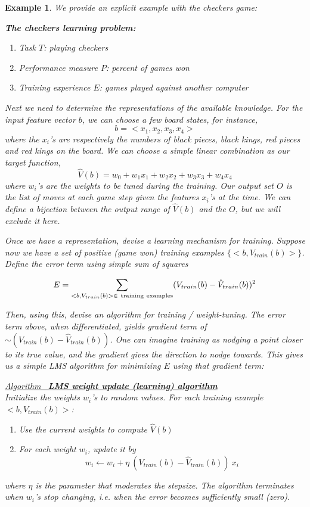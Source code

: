 \documentclass[12pt]{article}  %
\newtheorem{example}{Example}
\newcommand{\algtitle}[1]{\underline{Algorithm \ {\bf #1}} \vspace*{1mm}\\}
\begin{document}
\begin{example}
We provide an explicit example with the checkers game:

{\bf The checkers learning problem:}
\begin{enumerate}
\item Task $T$: playing checkers
\item Performance measure $P$: percent of games won
\item Training experience $E$: games played against another computer
\end{enumerate}

Next we need to determine the representations of the available knowledge. For the input feature vector $b$, we can choose a few board states, for instance, 
$$b = <x_1, x_2, x_3, x_4>$$
where the $x_i$'s are respectively the numbers of black pieces, black kings, red pieces and red kings on the board. We can choose a simple linear combination as our target function,
$$\hat{V}(b) = w_0 + w_1 x_1 + w_2 x_2 + w_3 x_3 + w_4 x_4$$
where $w_i$'s are the weights to be tuned during the training. Our output set $O$ is the list of moves at each game step given the features $x_i$'s at the time. We can define a bijection between the output range of $\hat{V}(b)$ and the $O$, but we will exclude it here.

Once we have a representation, devise a learning mechanism for training. Suppose now we have a set of positive (game won) training examples $\{<b, V_{train}(b)>\}$. Define the error term using simple sum of squares

$$E = \sum_{<b, V_{train}(b)> \in \ {\rm training\ examples}} (V_{train}(b) - \hat{V}_{train}(b))^2$$

Then, using this, devise an algorithm for training / weight-tuning. The error term above, when differentiated, yields gradient term of $\sim(V_{train}(b) - \hat{V}_{train}(b))$. One can imagine training as nodging a point closer to its true value, and the gradient gives the direction to nodge towards. This gives us a simple LMS algorithm for minimizing $E$ using that gradient term:


\algtitle{LMS weight update (learning) algorithm}
Initialize the weights $w_i$'s to random values. For each training example $<b, V_{train}(b)>$:
\begin{enumerate}
	\item Use the current weights to compute $\hat{V}(b)$
	\item For each weight $w_i$, update it by $$w_i \leftarrow w_i + \eta \ (V_{train}(b) - \hat{V}_{train}(b)) \ x_i$$
\end{enumerate}

where $\eta$ is the parameter that moderates the stepsize. The algorithm terminates when $w_i$'s stop changing, i.e. when the error becomes sufficiently small (zero).

\end{example}
\end{document}
